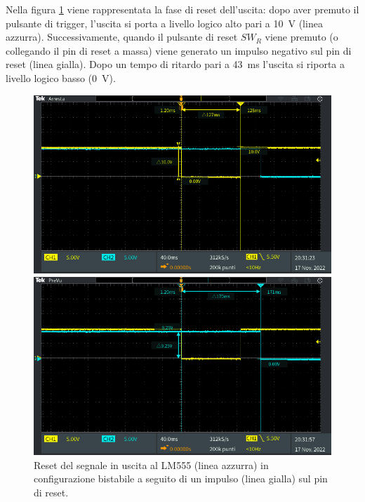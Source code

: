 \noindent
Nella figura \ref{fig:circuito_2_scope} viene rappresentata la fase di reset dell'uscita: dopo aver premuto il pulsante di trigger, l'uscita si porta a livello logico alto pari a \SI{10}{\volt} (linea azzurra). Successivamente, quando il pulsante di reset $SW_R$ viene premuto (o collegando il pin di reset a massa) viene generato un impulso negativo sul pin di reset (linea gialla). Dopo un tempo di ritardo pari a \SI{43}{\milli\second} l'uscita si riporta a livello logico basso (\SI{0}{\volt}).
\begin{figure}[tbh]
	\centering
	\begin{minipage}{.496\textwidth}
		\includegraphics[width=\linewidth]{./ImageFiles/Laboratorio 5/TEK00010.PNG}
	\end{minipage}
	\begin{minipage}{.496\textwidth}
		\includegraphics[width=\linewidth]{./ImageFiles/Laboratorio 5/TEK00011.PNG}
	\end{minipage}
	\caption{Reset del segnale in uscita al LM555 (linea azzurra) in configurazione bistabile a seguito di un impulso (linea gialla) sul pin di reset.}
	\label{fig:circuito_2_scope}
\end{figure}

